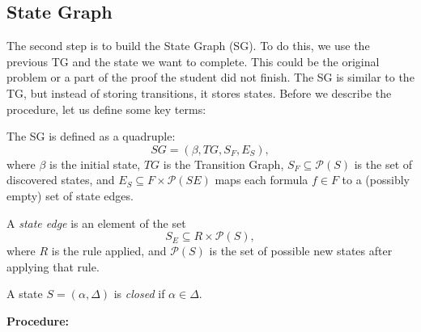 \documentclass[runningheads]{llncs}
\begin{document}
\subsection{State Graph}

The second step is to build the State Graph (SG). To do this, we use the previous TG and the state we want to complete. This could be the original problem or a part of the proof the student did not finish. The SG is similar to the TG, but instead of storing transitions, it stores states. Before we describe the procedure, let us define some key terms:

\begin{definition}
The SG is defined as a quadruple:
\[
SG = (\beta, TG, S_F, E_S),
\]
where \( \beta \) is the initial state, \(TG\) is the Transition Graph, \(S_F \subseteq \mathcal{P}(S)\) is the set of discovered states, and \(E_S \subseteq F \times \mathcal{P}(SE)\) maps each formula \( f \in F \) to a (possibly empty) set of state edges.
\end{definition}

\begin{definition}
A \emph{state edge} is an element of the set
\[
S_E \subseteq R \times \mathcal{P}(S),
\]
where \(R\) is the rule applied, and \(\mathcal{P}(S)\) is the set of possible new states after applying that rule.
\end{definition}

\begin{definition}
A state \(S = (\alpha, \Delta)\) is \emph{closed} if \(\alpha \in \Delta\).
\end{definition}

\vspace{1em}
\textbf{Procedure:}
\end{document}
